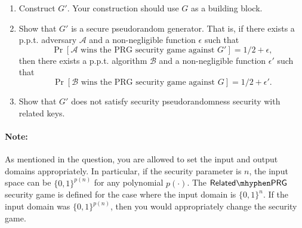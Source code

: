 \documentclass[10pt,addpoints]{exam}
\newcommand{\calA}{\mathcal{A}}
\newcommand{\calB}{\mathcal{B}}
\theoremstyle{definition}
\newcommand{\relatedprg}{\mathsf{Related\mhyphen PRG}}
\begin{document}
\begin{enumerate}
    \item Construct $G'$. Your construction should use $G$ as a building block. 
    \item Show that $G'$ is a secure pseudorandom generator. That is, if there exists a p.p.t. adversary $\calA$ and a non-negligible function $\epsilon$ such that $$\Pr[\calA \text{ wins the PRG security game against }G'] = 1/2 + \epsilon,$$ then there exists a p.p.t. algorithm $\calB$ and a non-negligible function $\epsilon'$ such that $$\Pr[\calB \text{ wins the PRG security game against }G] = 1/2 + \epsilon'.$$
    
    \item Show that $G'$ does not satisfy security pseudorandomness security with related keys. 
\end{enumerate}


\vspace{10pt}

\paragraph{Note:} As mentioned in the question, you are allowed to set the input and output domains appropriately. In particular, if the security parameter is $n$, the input space can be $\{0,1\}^{p(n)}$ for any polynomial $p(\cdot)$. The $\relatedprg$ security game is defined for the case where the input domain is $\{0,1\}^n$. If the input domain was $\{0,1\}^{p(n)}$, then you would appropriately change the security game.  

\vspace{10pt}
\end{document}
